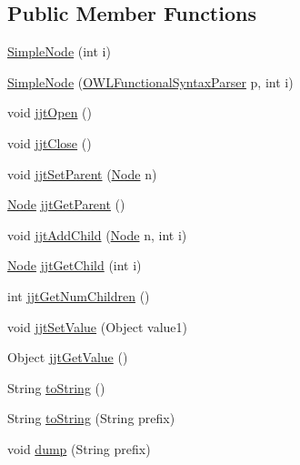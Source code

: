 \subsection*{Public Member Functions}
\begin{DoxyCompactItemize}
\item 
\hyperlink{classorg_1_1coode_1_1owlapi_1_1functionalparser_1_1_simple_node_a2eda3c1d9cdec2f7f810ba84befb7093}{Simple\-Node} (int i)
\item 
\hyperlink{classorg_1_1coode_1_1owlapi_1_1functionalparser_1_1_simple_node_a4bda820e89e0122819fb6cef67b276e6}{Simple\-Node} (\hyperlink{classorg_1_1coode_1_1owlapi_1_1functionalparser_1_1_o_w_l_functional_syntax_parser}{O\-W\-L\-Functional\-Syntax\-Parser} p, int i)
\item 
void \hyperlink{classorg_1_1coode_1_1owlapi_1_1functionalparser_1_1_simple_node_a0df8144461c987e6854dc74ee311f975}{jjt\-Open} ()
\item 
void \hyperlink{classorg_1_1coode_1_1owlapi_1_1functionalparser_1_1_simple_node_a404ae67146eee0d87dc40e4f63cb5557}{jjt\-Close} ()
\item 
void \hyperlink{classorg_1_1coode_1_1owlapi_1_1functionalparser_1_1_simple_node_a2d4b2eeea233b9499821cbee7a397225}{jjt\-Set\-Parent} (\hyperlink{interfaceorg_1_1coode_1_1owlapi_1_1functionalparser_1_1_node}{Node} n)
\item 
\hyperlink{interfaceorg_1_1coode_1_1owlapi_1_1functionalparser_1_1_node}{Node} \hyperlink{classorg_1_1coode_1_1owlapi_1_1functionalparser_1_1_simple_node_a80252297a0dcd44ceacb9e8e6be93703}{jjt\-Get\-Parent} ()
\item 
void \hyperlink{classorg_1_1coode_1_1owlapi_1_1functionalparser_1_1_simple_node_abd2c18089f36f5b2205e3afadca1358a}{jjt\-Add\-Child} (\hyperlink{interfaceorg_1_1coode_1_1owlapi_1_1functionalparser_1_1_node}{Node} n, int i)
\item 
\hyperlink{interfaceorg_1_1coode_1_1owlapi_1_1functionalparser_1_1_node}{Node} \hyperlink{classorg_1_1coode_1_1owlapi_1_1functionalparser_1_1_simple_node_a5c003a260db40acee52cf7e6d95e80c9}{jjt\-Get\-Child} (int i)
\item 
int \hyperlink{classorg_1_1coode_1_1owlapi_1_1functionalparser_1_1_simple_node_a49f706627ae860eab66f69c0663de0d7}{jjt\-Get\-Num\-Children} ()
\item 
void \hyperlink{classorg_1_1coode_1_1owlapi_1_1functionalparser_1_1_simple_node_a085ba1f7b2ccae4c0f2521cb2de6a336}{jjt\-Set\-Value} (Object value1)
\item 
Object \hyperlink{classorg_1_1coode_1_1owlapi_1_1functionalparser_1_1_simple_node_ac78d7836070cc1bebf5bae2e8883e541}{jjt\-Get\-Value} ()
\item 
String \hyperlink{classorg_1_1coode_1_1owlapi_1_1functionalparser_1_1_simple_node_a0a624dd3fa8833d0b6e48786f28ce78d}{to\-String} ()
\item 
String \hyperlink{classorg_1_1coode_1_1owlapi_1_1functionalparser_1_1_simple_node_a12a352d3ea5207390b65b3752672fda7}{to\-String} (String prefix)
\item 
void \hyperlink{classorg_1_1coode_1_1owlapi_1_1functionalparser_1_1_simple_node_a16ef4f72061bfee41ad9f836b140a987}{dump} (String prefix)
\end{DoxyCompactItemize}
